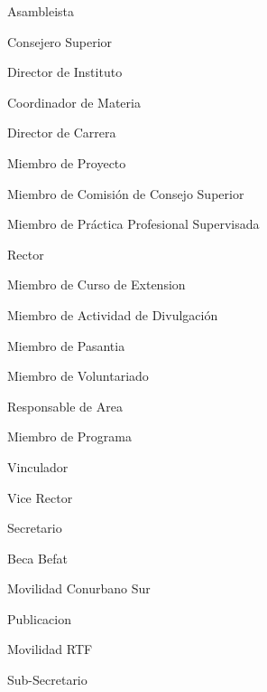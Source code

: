 \item Asambleista
\item Consejero Superior
\item Director de Instituto
\item Coordinador de Materia
\item Director de Carrera
\item Miembro de Proyecto
\item Miembro de Comisión de Consejo Superior
\item Miembro de Práctica Profesional Supervisada
\item Rector
\item Miembro de Curso de Extension
\item Miembro de Actividad de Divulgación
\item Miembro de Pasantia
\item Miembro de Voluntariado
\item Responsable de Area
\item Miembro de Programa
\item Vinculador
\item Vice Rector
\item Secretario
\item Beca Befat
\item Movilidad Conurbano Sur
\item Publicacion
\item Movilidad RTF
\item Sub-Secretario
